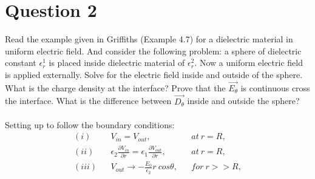 \documentclass[a4paper,12pt]{article}
\newcommand{\V}[1]{\ensuremath{\vec{#1}}}
\newcommand{\F}[2]{\ensuremath{\frac{#1}{#2}}}
\newcommand{\Q}[1]{\newpage \section*{#1}}
\begin{document}
\Q{Question 2}
Read the example given in Griffiths (Example 4.7) for a dielectric material in uniform electric field.  And consider the following problem: a sphere of dielectric constant $\epsilon_r^1$ is placed inside dielectric material of $\epsilon_r^2$.  Now a uniform electric field is applied externally.  Solve for the electric field inside and outside of the sphere.  What is the charge density at the interface?  Prove that the $\V{E_\theta}$ is continuous cross the interface.  What is the difference between $\V{D_\theta}$ inside and outside the sphere?\\
\\
Setting up to follow the boundary conditions:
\begin{align*}
(i)& &V_{in}=V_{out}, & & at\ r=R,\\
(ii)& &\epsilon_2\F{\partial V_{in}}{\partial r}=\epsilon_1\F{\partial V_{out}}{\partial r}, & & at\ r=R,\\
(iii)& &V_{out}\rightarrow-\F{E_0}{\epsilon_2}r\ cos\theta, & & for\ r>>R,
\end{align*}
\end{document}
